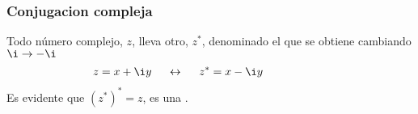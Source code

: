 \documentclass[letterpaper,10pt,english]{jupyterBook}
\begin{document}
\subsubsection{Conjugacion compleja}
\label{\detokenize{docs/Part_01_Formalismo/Chapter_01_02_Formalismo_matem_xe1tico/01_01_Numeros_Complejos_myst:conjugacion-compleja}}
\sphinxAtStartPar
Todo número complejo, \(z\), lleva  otro, \(z^*\), denominado el  que se obtiene cambiando \(\i \to -\i\)
\begin{equation*}
\begin{split}
z = x+\i y ~~~~\leftrightarrow~~~~ z^* = x - \i y \hspace{2cm}
\end{split}
\end{equation*}
\sphinxAtStartPar
Es evidente que \((z^*)^* = z\), es una .
\end{document}
